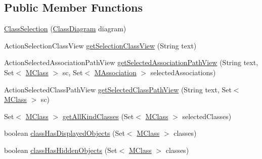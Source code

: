 \subsection*{Public Member Functions}
\begin{DoxyCompactItemize}
\item 
\hyperlink{classorg_1_1tzi_1_1use_1_1gui_1_1views_1_1selection_1_1classselection_1_1_class_selection_af3b55e18233e2369047be2116f1db992}{Class\-Selection} (\hyperlink{classorg_1_1tzi_1_1use_1_1gui_1_1views_1_1diagrams_1_1classdiagram_1_1_class_diagram}{Class\-Diagram} diagram)
\item 
Action\-Selection\-Class\-View \hyperlink{classorg_1_1tzi_1_1use_1_1gui_1_1views_1_1selection_1_1classselection_1_1_class_selection_a983116718786198599bfa6fc4dd6ddde}{get\-Selection\-Class\-View} (String text)
\item 
Action\-Selected\-Association\-Path\-View \hyperlink{classorg_1_1tzi_1_1use_1_1gui_1_1views_1_1selection_1_1classselection_1_1_class_selection_a309b303f9ac283e39bd0b813582dc48c}{get\-Selected\-Association\-Path\-View} (String text, Set$<$ \hyperlink{interfaceorg_1_1tzi_1_1use_1_1uml_1_1mm_1_1_m_class}{M\-Class} $>$ sc, Set$<$ \hyperlink{interfaceorg_1_1tzi_1_1use_1_1uml_1_1mm_1_1_m_association}{M\-Association} $>$ selected\-Associations)
\item 
Action\-Selected\-Class\-Path\-View \hyperlink{classorg_1_1tzi_1_1use_1_1gui_1_1views_1_1selection_1_1classselection_1_1_class_selection_ac7f77a175a134ddb59547a3f894ebd5d}{get\-Selected\-Class\-Path\-View} (String text, Set$<$ \hyperlink{interfaceorg_1_1tzi_1_1use_1_1uml_1_1mm_1_1_m_class}{M\-Class} $>$ sc)
\item 
Set$<$ \hyperlink{interfaceorg_1_1tzi_1_1use_1_1uml_1_1mm_1_1_m_class}{M\-Class} $>$ \hyperlink{classorg_1_1tzi_1_1use_1_1gui_1_1views_1_1selection_1_1classselection_1_1_class_selection_a158f58b05cf2a50c5ddef6ea6373b081}{get\-All\-Kind\-Classes} (Set$<$ \hyperlink{interfaceorg_1_1tzi_1_1use_1_1uml_1_1mm_1_1_m_class}{M\-Class} $>$ selected\-Classes)
\item 
boolean \hyperlink{classorg_1_1tzi_1_1use_1_1gui_1_1views_1_1selection_1_1classselection_1_1_class_selection_ad4a2cb65d41697edc4481be753812919}{class\-Has\-Displayed\-Objects} (Set$<$ \hyperlink{interfaceorg_1_1tzi_1_1use_1_1uml_1_1mm_1_1_m_class}{M\-Class} $>$ classes)
\item 
boolean \hyperlink{classorg_1_1tzi_1_1use_1_1gui_1_1views_1_1selection_1_1classselection_1_1_class_selection_aecd312dfd601038237f2ae26776d1cd1}{class\-Has\-Hidden\-Objects} (Set$<$ \hyperlink{interfaceorg_1_1tzi_1_1use_1_1uml_1_1mm_1_1_m_class}{M\-Class} $>$ classes)

\end{DoxyCompactItemize}
